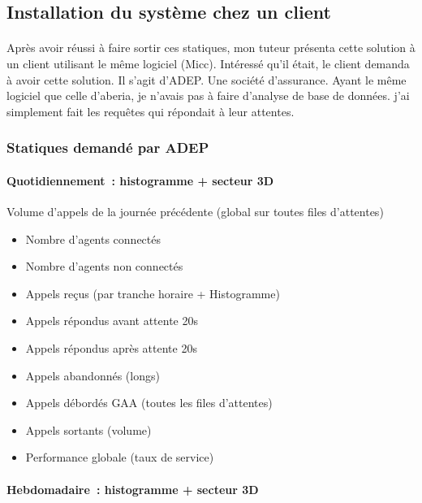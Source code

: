 \documentclass[a4paper,12pt]{report}
\begin{document}
\subsection{Installation du système chez un client}

\paragraph*{}
                   Après avoir réussi à faire sortir ces statiques, mon tuteur présenta cette solution à un client utilisant le même logiciel (Micc). Intéressé qu’il était, le client demanda à avoir cette solution. Il s’agit d’ADEP. Une société d'assurance. 
                   Ayant le même logiciel que celle d’aberia, je n’avais pas à faire d'analyse de base de données. j’ai simplement fait les requêtes qui répondait à leur attentes.
\subsubsection{Statiques demandé par ADEP}
\paragraph{Quotidiennement : histogramme + secteur 3D\newline}
                   Volume d’appels de la journée précédente (global sur toutes files d’attentes) \newline
\begin{itemize}
 \item  Nombre d’agents connectés
                   \item  Nombre d’agents non connectés             
                     \item Appels reçus (par tranche horaire + Histogramme)
                    \item Appels répondus avant attente 20s
                    \item Appels répondus après attente 20s 
                    \item Appels abandonnés (longs)
                    \item Appels débordés GAA (toutes les files d’attentes)
                    \item Appels sortants (volume)
                    \item Performance globale (taux de service)
\end{itemize}

\paragraph*{Hebdomadaire : histogramme + secteur 3D}
\end{document}
